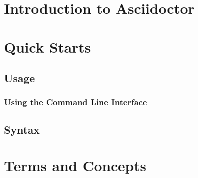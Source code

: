 \hypertarget{x-introduction-to-asciidoctor}{\section{Introduction to Asciidoctor}}
\hypertarget{x-quick-starts}{\section{Quick Starts}}
\hypertarget{x-usage}{\subsection{Usage}}
\hypertarget{x-using-the-command-line-interface}{\subsubsection{Using the Command Line Interface}}
\hypertarget{x-syntax}{\subsection{Syntax}}
\hypertarget{x-terms-and-concepts}{\section{Terms and Concepts}}
